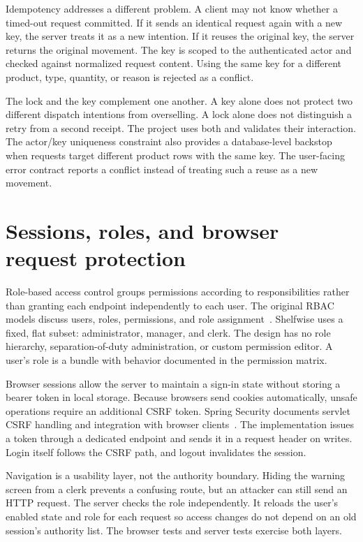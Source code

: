 Idempotency addresses a different problem. A client may not know whether a timed-out request committed. If it sends an identical request again with a new key, the server treats it as a new intention. If it reuses the original key, the server returns the original movement. The key is scoped to the authenticated actor and checked against normalized request content. Using the same key for a different product, type, quantity, or reason is rejected as a conflict.

The lock and the key complement one another. A key alone does not protect two different dispatch intentions from overselling. A lock alone does not distinguish a retry from a second receipt. The project uses both and validates their interaction. The actor/key uniqueness constraint also provides a database-level backstop when requests target different product rows with the same key. The user-facing error contract reports a conflict instead of treating such a reuse as a new movement.

\section{Sessions, roles, and browser request protection}
Role-based access control groups permissions according to responsibilities rather than granting each endpoint independently to each user. The original RBAC models discuss users, roles, permissions, and role assignment~\citep{sandhu1996}. Shelfwise uses a fixed, flat subset: administrator, manager, and clerk. The design has no role hierarchy, separation-of-duty administration, or custom permission editor. A user's role is a bundle with behavior documented in the permission matrix.

Browser sessions allow the server to maintain a sign-in state without storing a bearer token in local storage. Because browsers send cookies automatically, unsafe operations require an additional CSRF token. Spring Security documents servlet CSRF handling and integration with browser clients~\citep{spring-csrf}. The implementation issues a token through a dedicated endpoint and sends it in a request header on writes. Login itself follows the CSRF path, and logout invalidates the session.

Navigation is a usability layer, not the authority boundary. Hiding the warning screen from a clerk prevents a confusing route, but an attacker can still send an HTTP request. The server checks the role independently. It reloads the user's enabled state and role for each request so access changes do not depend on an old session's authority list. The browser tests and server tests exercise both layers.

